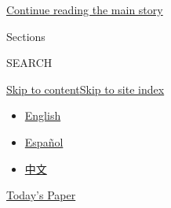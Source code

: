 \protect\hyperlink{after-dfp-ad-top}{Continue reading the main story}

Sections

SEARCH

\protect\hyperlink{site-content}{Skip to
content}\protect\hyperlink{site-index}{Skip to site index}

\begin{itemize}
\tightlist
\item
  \href{/}{English}
\item
  \href{https://www.nytimes3xbfgragh.onion/es/}{Español}
\item
  \href{https://cn.nytimes3xbfgragh.onion}{中文}
\end{itemize}

\href{https://myaccount.nytimes3xbfgragh.onion/auth/login?response_type=cookie\&client_id=vi}{}

\href{https://www.nytimes3xbfgragh.onion/section/todayspaper}{Today's
Paper}


